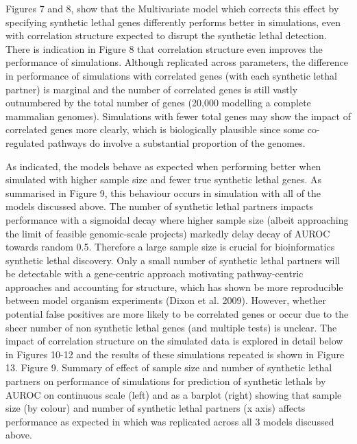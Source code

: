 Figures 7 and 8, show that the Multivariate model which corrects this effect by specifying \gls{synthetic lethal} genes differently performs better in simulations, even with correlation structure expected to disrupt the \gls{synthetic lethal} detection.  There is indication in Figure 8 that correlation structure even improves the performance of simulations.  Although replicated across parameters, the difference in performance of simulations with correlated genes (with each \gls{synthetic lethal} partner) is marginal and the number of correlated genes is still vastly outnumbered by the total number of genes (20,000 modelling a complete mammalian \glspl{genome}).  Simulations with fewer total genes may show the impact of correlated genes more clearly, which is biologically plausible since some co-regulated pathways do involve a substantial proportion of the \glspl{genome}.

As indicated, the models behave as expected when performing better when simulated with higher sample size and fewer true \gls{synthetic lethal} genes.  As summarised in Figure 9, this behaviour occurs in simulation with all of the models discussed above.  The number of \gls{synthetic lethal} partners impacts performance with a sigmoidal decay where­­ higher sample size (albeit approaching the limit of feasible \gls{genomic}-scale projects) markedly delay decay of \gls{AUROC} towards random 0.5.  Therefore a large sample size is crucial for \gls{bioinformatics} \gls{synthetic lethal} discovery.  Only a small number of \gls{synthetic lethal} partners will be detectable with a gene-centric approach motivating pathway-centric approaches and accounting for  structure, which has shown be more reproducible between model organism experiments (Dixon et al. 2009).  However, whether potential false positives are more likely to be correlated genes or occur due to the sheer number of non synthetic lethal genes (and multiple tests) is unclear.  The impact of correlation structure on the simulated data is explored in detail below in Figures 10-12 and the results of these simulations repeated is shown in Figure 13.    Figure 9.  Summary of effect of sample size and number of \gls{synthetic lethal} partners on performance of simulations for prediction of \glspl{synthetic lethal} by \gls{AUROC} on continuous scale (left) and as a barplot (right) showing that sample size (by colour) and number of \gls{synthetic lethal} partners (x axis) affects performance as expected in which was replicated across all 3 models discussed above.

